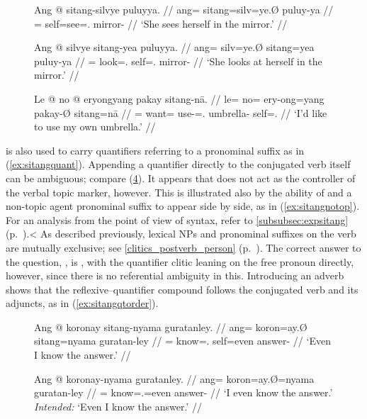 \begin{figure}
\ex\label{ex:reflvb}\begingl
	\gla Ang @ sitang-silvye puluyya. //
	\glb ang= sitang=silv=ye.Ø puluy-ya //
	\glc \AgtT{}= self=see=\TsgF{}.\Top{} mirror-\Loc{} //
	\glft `She sees herself in the mirror.' //
\endgl\xe
\end{figure}

\begin{figure}
\ex\label{ex:reflloc}\begingl
	\gla Ang @ silvye sitang-yea puluyya. //
	\glb ang= silv=ye.Ø sitang=yea puluy-ya //
	\glc \AgtT{}= look=\TsgF{}.\Top{} self=\TsgF{}.\Loc{} mirror-\Loc{} //
	\glft `She looks at herself in the mirror.' //
\endgl\xe
\end{figure}

\begin{figure}
\ex\label{ex:emphposs}%
\begingl
	\gla Le @ no @ eryongyang pakay sitang-nā. //
	\glb le= no= ery-ong=yang pakay-Ø sitang=nā //
	\glc \PatTI{}= want= use-\Irr{}=\Fsg{}.\Aarg{} umbrella-\Top{} 
		self=\Fsg{}.\Gen{} //
	\glft `I'd like to use my own umbrella.' //
\endgl\xe
\end{figure}

 is also used to carry quantifiers referring to a
pronominal suffix as in (\ref{ex:sitangquant}). Appending a quantifier directly
to the conjugated verb itself can be ambiguous; compare
(\ref{ex:nositangquant}). It appears that  does not act as
the controller of the verbal topic marker, however. This is illustrated also by
the ability of  and a non-topic agent pronominal suffix to
appear side by side, as in (\ref{ex:sitangnotop}). For an analysis
from the point of view of syntax, refer to \autoref{subsubsec:expsitang} 
(p.~\pageref{subsubsec:expsitang}).< As described previously, lexical NPs and
pronominal suffixes on the verb are mutually exclusive; see
\autoref{clitics_postverb_person} (p.~\pageref{clitics_postverb_person}). The
correct answer to the question, , is ,
with the quantifier clitic leaning on the free pronoun directly, however, since
there is no referential ambiguity in this. Introducing an adverb shows that the
reflexive--quantifier compound follows the conjugated verb and its adjuncts, as
in (\ref{ex:sitangqtorder}).

\begin{figure}
\pex
\a\label{ex:sitangquant}\begingl
	\gla Ang @ koronay sitang-nyama guratanley. //
	\glb ang= koron=ay.Ø sitang=nyama guratan-ley //
	\glc \AgtT{}= know=\Fsg{}.\Top{} self=even answer-\PargI{} //
	\glft `Even I know the answer.' //
\endgl

\a\label{ex:nositangquant}\ljudge\excl\begingl
	\gla Ang @ koronay-nyama guratanley. //
	\glb ang= koron=ay.Ø=nyama guratan-ley //
	\glc \AgtT{}= know=\Fsg{}.\Top{}=even answer-\PargI{} //
	\glft `I even know the answer.' \\
		\textit{Intended:} `Even I know the answer.' //
\endgl
\xe
\end{figure}

